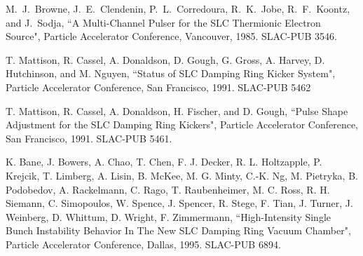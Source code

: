 \documentclass[aps,prl,preprint,groupedaddress]{revtex4-1}
\begin{document}
\begin{thebibliography}{9}
% 
  M.~J.~Browne, J.~E.~Clendenin, P.~L.~Corredoura, R.~K.~Jobe, R.~F.~Koontz, and J.~Sodja, 
  ``A Multi-Channel Pulser for the SLC Thermionic Electron Source", 
  Particle Accelerator Conference, Vancouver, 1985. 
  SLAC-PUB 3546.
  
  T. Mattison, R. Cassel, A. Donaldson, D. Gough, G. Gross, A. Harvey, D. Hutchinson, and M. Nguyen,
  ``Status of SLC Damping Ring Kicker System",
  Particle Accelerator Conference, San Francisco, 1991.
  SLAC-PUB 5462
  
  T. Mattison, R. Cassel, A. Donaldson, H. Fischer, and D. Gough,
  ``Pulse Shape Adjustment for the SLC Damping Ring Kickers",
  Particle Accelerator Conference, San Francisco, 1991.
  SLAC-PUB 5461.
  
  K. Bane, J. Bowers, A. Chao, T. Chen, F. J. Decker, R. L. Holtzapple, P. Krejcik, T. Limberg, A. Lisin, B. McKee, M. G. Minty, C.-K. Ng, M. Pietryka, B. Podobedov, A. Rackelmann, C. Rago, T. Raubenheimer, M. C. Ross, R. H. Siemann, C. Simopoulos, W. Spence, J. Spencer, R. Stege, F. Tian, J. Turner, J. Weinberg, D. Whittum, D. Wright, F. Zimmermann,
  ``High-Intensity Single Bunch Instability Behavior In The New SLC Damping Ring Vacuum Chamber",
  Particle Accelerator Conference, Dallas, 1995.
  SLAC-PUB 6894.
    
\end{thebibliography}
\end{document}
